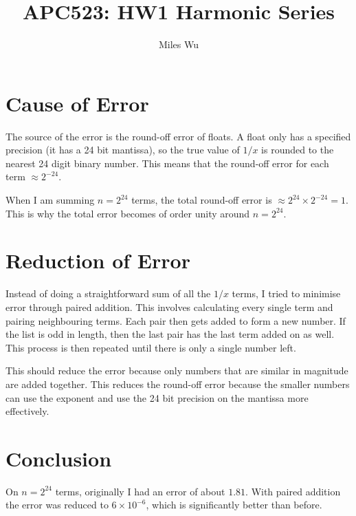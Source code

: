 \documentclass[12pt]{article}
\begin{document}
\title{APC523: HW1 Harmonic Series}
\author{Miles Wu}
\maketitle

\section{Cause of Error}
The source of the error is the round-off error of floats. A float only has a specified precision (it has a 24 bit mantissa), so the true value of $1/x$ is rounded to the nearest 24 digit binary number. This means that the round-off error for each term $\approx 2^{-24}$.

When I am summing $n = 2^{24}$ terms, the total round-off error is $\approx 2^{24} \times 2^{-24} = 1$. This is why the total error becomes of order unity around $n = 2^{24}$.

\section{Reduction of Error}
Instead of doing a straightforward sum of all the $1/x$ terms, I tried to minimise error through paired addition. This involves calculating every single term and pairing neighbouring terms. Each pair then gets added to form a new number. If the list is odd in length, then the last pair has the last term added on as well. This process is then repeated until there is only a single number left.

This should reduce the error because only numbers that are similar in magnitude are added together. This reduces the round-off error because the smaller numbers can use the exponent and use the 24 bit precision on the mantissa more effectively.

\section{Conclusion}

On $n = 2^{24}$ terms, originally I had an error of about $1.81$. With paired addition the error was reduced to $6 \times 10^{-6}$, which is significantly better than before.
\end{document}
